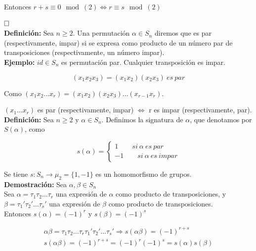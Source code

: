 \documentclass{article}
\begin{document}
Entonces $r+s\equiv 0 \mod{(2)}\Leftrightarrow r\equiv s \mod{(2)}$

$\hfill\square$ \\

\textbf{Definición:} Sea $n\geq 2$. Una permutación $\alpha \in S_n$ diremos que es par (respectivamente, impar) si se expresa como producto de un número par de transposiciones (respectivamente, un número impar). \\

\textbf{Ejemplo:} $id\in S_n$ es permutación par. Cualquier transposición es impar.

\begin{equation*}
(x_1x_2x_3)=(x_1x_2)(x_2x_3) \: es \: par
\end{equation*}

Como $(x_1x_2\ldots x_r)=(x_1x_2)(x_2x_3)\ldots(x_{r-1}x_r)$.

$(x_1\ldots x_r)$ es par (respectivamente, impar) $\Leftrightarrow$ r es impar (respectivamente, par). \\

\textbf{Definición:} Sea $n\geq 2$ y $\alpha \in S_n$. Definimos la signatura de $\alpha$, que denotamos por $S(\alpha)$, como

\begin{equation*}
s(\alpha)=\left\lbrace \begin{array}{c}
1 \qquad si\:\alpha\:es\:par \\
-1 \qquad si\:\alpha\:es\:impar
\end{array} \right.
\end{equation*}

Se tiene $s:S_n\rightarrow \mu_2=\{1,-1\}$ es un homomorfismo de grupos. \\

\textbf{Demostración:} Sea $\alpha,\beta \in S_n$ \\

Sea $\alpha=\tau_1\tau_2\ldots\tau_r$ una expresión de $\alpha$ como producto de transposiciones, y $\beta=\tau_1'\tau_2'\ldots\tau_s'$ una expresión de $\beta$ como producto de transposiciones. \\

Entonces $s(\alpha)=(-1)^r$ y $s(\beta)=(-1)^s$ 

\begin{gather*}
\alpha\beta=\tau_1\tau_2\ldots\tau_r\tau_1'\tau_2'\ldots\tau_s'\Rightarrow s(\alpha\beta)=(-1)^{r+s} \\
s(\alpha\beta)=(-1)^{r+s}=(-1)^r(-1)^s=s(\alpha)s(\beta)
\end{gather*}
\end{document}
